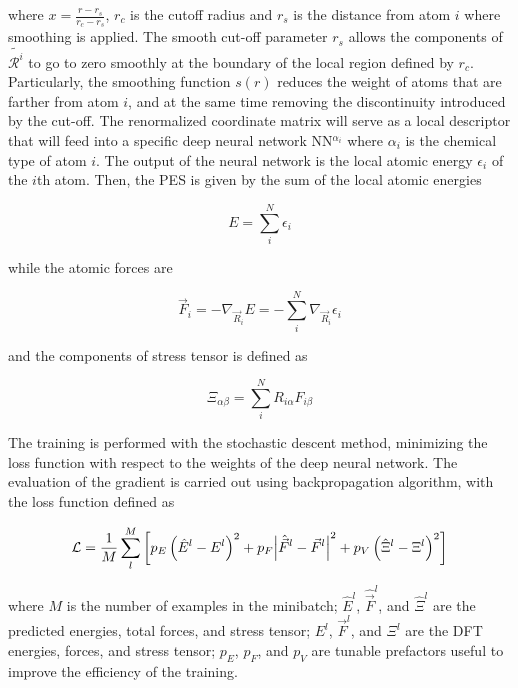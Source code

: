 where $x = \frac{r- r_s}{r_c-r_s}$, $r_c$ is the cutoff radius and $r_s$ is the
distance from atom $i$ where smoothing is applied. The	smooth cut-off
parameter $r_s$ allows the components of $\tilde{\mathcal{R}^i}$ to
go to zero smoothly at the boundary of the local region defined by $r_c$.
Particularly, the smoothing function $s(r)$ reduces the weight of atoms that
are farther from atom $i$, and at the same time removing the discontinuity
introduced by the cut-off. The renormalized coordinate matrix will serve as a
local descriptor that will feed into a specific deep neural network
NN$^{\alpha_i}$ where $\alpha_i$ is the chemical type of atom $i$. The output
of the neural network is the local atomic energy $\epsilon_i$ of the $i$th
atom. Then, the PES is given by the sum of the local atomic energies

\begin{equation}
    E = \sum_i^N	\epsilon_i
\end{equation}

while the atomic forces are

\begin{equation}
    \vec{F}_i = - \nabla_{\vec{R}_i} E = - \sum_i^N \nabla_{\vec{R}_i}
    \epsilon_i
\end{equation}

and the components of stress tensor is defined as

\begin{equation}
    \Xi_{\alpha \beta} = \sum_i^N R_{i\alpha} F_{i\beta}
\end{equation}

The training is performed with the stochastic descent method, minimizing the
loss function with respect to the weights of the deep neural network. The
evaluation of the gradient is carried out using backpropagation algorithm,
with the loss function defined as

\begin{equation}
    \mathcal{L} =   \frac{1}{M} \sum_l^M  \left[  p_E \left(\hat{E}^l- E^l
        \right)^2 +
        p_F \abs{\hat{\vec{F}}^l- \vec{F}^l}^2 + p_V \left(\hat{\Xi}^l- \Xi^l
        \right)^2 \right]
\end{equation}

where $M$ is the number of examples in the minibatch; $\hat{E}^l$,
$\hat{\vec{F}}^l$, and $\hat{\Xi}^l$
are the predicted energies, total forces, and stress tensor; $E^l$,
$\vec{F}^l$, and $\Xi^l$ are
the DFT
energies, forces, and stress tensor; $p_E$, $p_F$, and $p_V$  are tunable
prefactors
useful to improve the
efficiency of the training.